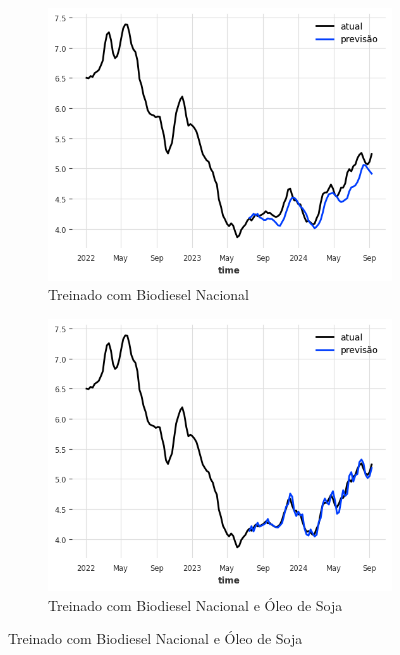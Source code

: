 \begin{figure}[htbp]
	\centering
	\begin{subfigure}[b]{0.45\textwidth}
		\centering
		\includegraphics[width=\textwidth]{figuras/mlp_takens_brasil_plot.png} %
		\caption{Treinado com Biodiesel Nacional \newline}
		\label{fig:mlp_takens_brasil_plot}
	\end{subfigure}
	\hfill
	\begin{subfigure}[b]{0.45\textwidth}
		\centering
		\includegraphics[width=\textwidth]{figuras/mlp_takens_brasil_oil_plot.png} %
		\caption{Treinado com Biodiesel Nacional e Óleo de Soja}
		\label{fig:mlp_takens_brasil_oil_plot}
	\end{subfigure}


\end{figure}
